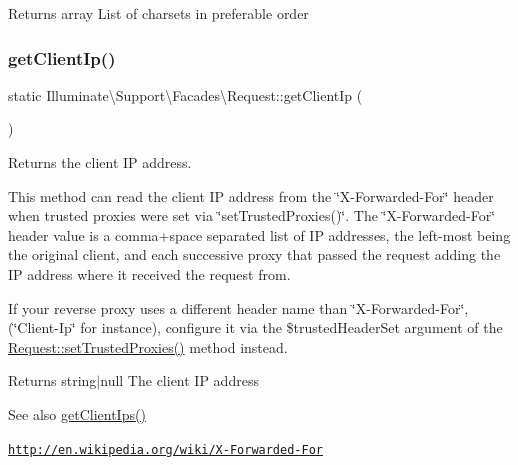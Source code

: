 \begin{DoxyReturn}{Returns}
array List of charsets in preferable order 
\end{DoxyReturn}
\mbox{\label{class_illuminate_1_1_support_1_1_facades_1_1_request_ac78e7218a697e138ce105a04d49f2ff7}} 
\subsubsection{\texorpdfstring{get\+Client\+Ip()}{getClientIp()}}
{\footnotesize\ttfamily static Illuminate\textbackslash{}\+Support\textbackslash{}\+Facades\textbackslash{}\+Request\+::get\+Client\+Ip (\begin{DoxyParamCaption}{ }\end{DoxyParamCaption})\hspace{0.3cm}{\ttfamily [static]}}

Returns the client IP address.

This method can read the client IP address from the \char`\"{}\+X-\/\+Forwarded-\/\+For\char`\"{} header when trusted proxies were set via \char`\"{}set\+Trusted\+Proxies()\char`\"{}. The \char`\"{}\+X-\/\+Forwarded-\/\+For\char`\"{} header value is a comma+space separated list of IP addresses, the left-\/most being the original client, and each successive proxy that passed the request adding the IP address where it received the request from.

If your reverse proxy uses a different header name than \char`\"{}\+X-\/\+Forwarded-\/\+For\char`\"{}, (\char`\"{}\+Client-\/\+Ip\char`\"{} for instance), configure it via the \$trusted\+Header\+Set argument of the \mbox{\hyperlink{class_illuminate_1_1_support_1_1_facades_1_1_request_a1686fbcf12f72ed06a19adf0633054fa}{Request\+::set\+Trusted\+Proxies()}} method instead.

\begin{DoxyReturn}{Returns}
string$\vert$null The client IP address 
\end{DoxyReturn}
\begin{DoxySeeAlso}{See also}
\mbox{\hyperlink{class_illuminate_1_1_support_1_1_facades_1_1_request_acff1ecb5fd2edd0194bfa8ab1c120bcd}{get\+Client\+Ips()}} 

\href{http://en.wikipedia.org/wiki/X-Forwarded-For}{\tt http\+://en.\+wikipedia.\+org/wiki/\+X-\/\+Forwarded-\/\+For} 
\end{DoxySeeAlso}
\mbox{\label{class_illuminate_1_1_support_1_1_facades_1_1_request_acff1ecb5fd2edd0194bfa8ab1c120bcd}} 

